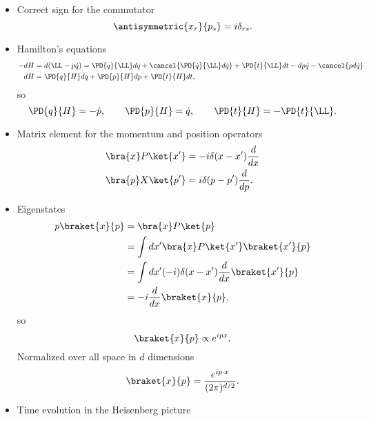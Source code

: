 \begin{itemize}
\item Correct sign for the commutator
\begin{equation}\label{eqn:usefulFormulas:80}
\antisymmetric{x_r}{p_s} = i \delta_{rs}.
\end{equation}
\item Hamilton's equations
\begin{equation}\label{eqn:usefulFormulas:100}
\begin{aligned}
-dH &= d(\LL - p \dot{q}) = \PD{q}{\LL} dq + \cancel{\PD{\dot{q}}{\LL} d\dot{q}} + \PD{t}{\LL} dt - dp \dot{q} - \cancel{p d\dot{q}} \\
dH &=
\PD{q}{H} dq
+
\PD{p}{H} dp
+
\PD{t}{H} dt,
\end{aligned}
\end{equation}
so
\begin{equation}\label{eqn:usefulFormulas:120}
\PD{q}{H} = -\dot{p},\qquad
\PD{p}{H} = \dot{q},\qquad
\PD{t}{H} = -\PD{t}{\LL}.
\end{equation}
\item Matrix element for the momentum and position operators
\begin{equation}\label{eqn:usefulFormulas:140}
\begin{aligned}
\bra{x} P \ket{x'} &= -i \delta(x- x') \frac{d}{dx} \\
\bra{p} X \ket{p'} &= i \delta(p- p') \frac{d}{dp}.
\end{aligned}
\end{equation}
\item Eigenstates
\begin{equation}\label{eqn:usefulFormulas:160}
\begin{aligned}
p \braket{x}{p}
&= \bra{x} P \ket{p} \\
&= \int dx' \bra{x} P \ket{x'} \braket{x'}{p} \\
&= \int dx' (-i) \delta(x - x') \frac{d}{dx} \braket{x'}{p} \\
&= -i \frac{d}{dx} \braket{x}{p},
\end{aligned}
\end{equation}
so
\begin{equation}\label{eqn:usefulFormulas:180}
\braket{x}{p} \propto e^{i p x}.
\end{equation}
Normalized over all space in \( d \) dimensions
\begin{equation}\label{eqn:usefulFormulas:200}
\braket{x}{p} = \frac{e^{i p \cdot x}}{(2 \pi)^{d/2}}.
\end{equation}
\item Time evolution in the Heisenberg picture

\end{itemize}
